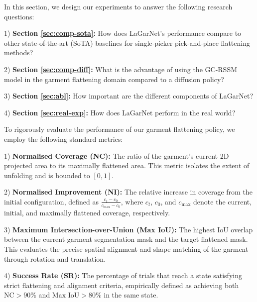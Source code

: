 \documentclass[journal]{IEEEtran}
\begin{document}
In this section, we design our experiments to answer the following research questions:

1) \textbf{Section \ref{sec:comp-sota}:} How does LaGarNet's performance compare to other state-of-the-art (SoTA) baselines for single-picker pick-and-place flattening methods?

2) \textbf{Section \ref{sec:comp-diff}:} What is the advantage of using the GC-RSSM model in the garment flattening domain compared to a diffusion policy? 

3) \textbf{Section \ref{sec:abl}:} How important are the different components of LaGarNet? 

4) \textbf{Section \ref{sec:real-exp}:} How does LaGarNet perform in the real world?    


To rigorously evaluate the performance of our garment flattening policy, we employ the following standard metrics:

1) \textbf{Normalised Coverage (NC):} The ratio of the garment's current 2D projected area to its maximally flattened area. This metric isolates the extent of unfolding and is bounded to $[0, 1]$.

2) \textbf{Normalised Improvement (NI):} The relative increase in coverage from the initial configuration, defined as $\frac{c_t - c_0}{c_{\text{max}} - c_0}$, where $c_t$, $c_0$, and $c_{\text{max}}$ denote the current, initial, and maximally flattened coverage, respectively. 

3) \textbf{Maximum Intersection-over-Union (Max IoU):} The highest IoU overlap between the current garment segmentation mask and the target flattened mask. This evaluates the precise spatial alignment and shape matching of the garment through rotation and translation.

4) \textbf{Success Rate (SR):} The percentage of trials that reach a state satisfying strict flattening and alignment criteria, empirically defined as achieving both $\text{NC} > 90\%$ and $\text{Max IoU} > 80\%$ in the same state.
\end{document}

